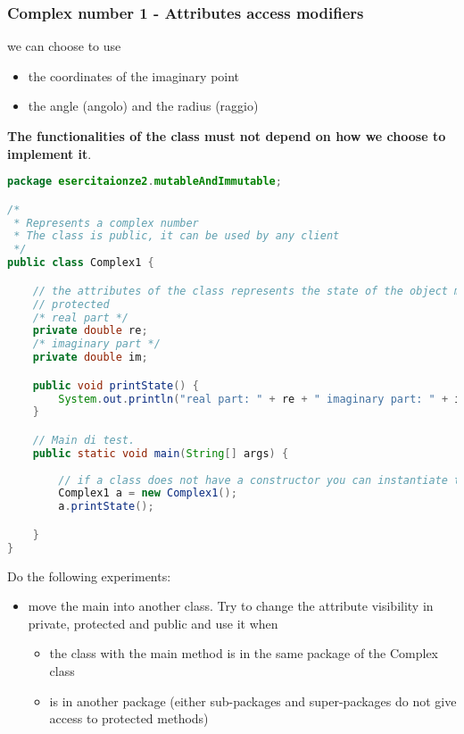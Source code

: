 \documentclass{article}
\begin{document}
\subsubsection{Complex number 1 - Attributes access modifiers}
we can choose to use
\begin{itemize}
\item  the coordinates of the imaginary point
\item the angle (angolo) and the radius (raggio)
\end{itemize}

\textbf{The functionalities of the class must not depend on how we choose to implement it}.

\begin{lstlisting}[language=Java,escapechar=|]
package esercitaionze2.mutableAndImmutable;

/*
 * Represents a complex number
 * The class is public, it can be used by any client
 */
public class Complex1 {

	// the attributes of the class represents the state of the object modeled by the class and are usually private or 
	// protected
	/* real part */
	private double re;
	/* imaginary part */
	private double im;

	public void printState() {
		System.out.println("real part: " + re + " imaginary part: " + im);
	}

	// Main di test.
	public static void main(String[] args) {
		
		// if a class does not have a constructor you can instantiate the class using the default constructor
		Complex1 a = new Complex1();
		a.printState();

	}
}
\end{lstlisting}

Do the following experiments:
\begin{itemize}
\item move the main into another class. Try to change the attribute visibility in private, protected and public and use it when
\begin{itemize}
\item the class with the main method is in the same package of the Complex class
\item is in another package (either sub-packages and super-packages do not give access to protected methods)
\end{itemize}
\end{itemize}
\end{document}
